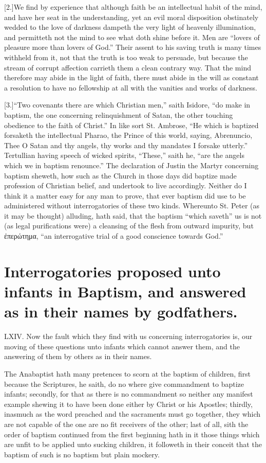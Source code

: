 [2.]We find by experience that although faith be an intellectual habit of the mind, and have her seat in the understanding, yet an evil moral disposition obstinately wedded to the love of darkness dampeth the very light of heavenly illumination, and permitteth not the mind to see what doth shine before it. Men are “lovers of pleasure more than lovers of God.” Their assent to his saving truth is many times withheld from it, not that the truth is too weak to persuade, but because the stream of corrupt affection carrieth them a clean contrary way. That the mind therefore may abide in the light of faith, there must abide in the will as constant a resolution to have no fellowship at all with the vanities and works of darkness.

[3.]“Two covenants there are which Christian men,” saith Isidore, “do make in baptism, the one concerning relinquishment of Satan, the other touching obedience to the faith of Christ.” In like sort St. Ambrose, “He which is baptized forsaketh the intellectual Pharao, the Prince of this world, saying, Abrenuncio, Thee O Satan and thy angels, thy works and thy mandates I forsake utterly.” Tertullian having speech of wicked spirits, “These,” saith he, “are the angels which we in baptism renounce.” The declaration of Justin the Martyr concerning baptism sheweth,  how such as the Church in those days did baptize made profession of Christian belief, and undertook to live accordingly.
 Neither do I think it a matter easy for any man to prove, that ever baptism did use to be administered without interrogatories of these two kinds. Whereunto St. Peter (as it may be thought) alluding, hath said, that the baptism “which saveth” us is not (as legal purifications were) a cleansing of the flesh from outward impurity, but ἐπερώτημα, “an interrogative trial of a good conscience towards God.”


\section*{Interrogatories proposed unto infants in Baptism, and answered as in their names by godfathers.}
LXIV. Now the fault which they find with us concerning interrogatories is, our moving of these questions unto infants which cannot answer them, and the answering of them by others as in their names.

The Anabaptist hath many pretences to scorn at the baptism of children, first because the Scriptures, he saith, do no where give commandment to baptize infants; secondly, for that as there is no commandment so neither any manifest example shewing it to have been done either by Christ or his Apostles; thirdly, inasmuch as the word preached and the sacraments must go together, they which are not capable of the one are no fit receivers of the other; last of all, sith the order of baptism continued from the first beginning hath in it those things which are unfit to be applied unto sucking children, it followeth in their conceit that the baptism of such is no baptism but plain mockery.

